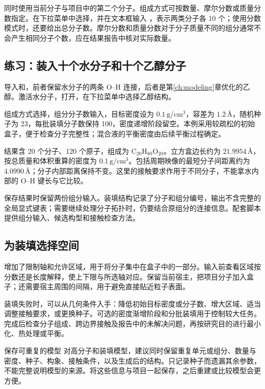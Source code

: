 同时使用当前分子与项目中的第二个分子。组成方式可按数量、摩尔分数或质量分数指定。在下拉菜单中选择，并在文本框输入 ，表示两类分子各 10 个；使用分数模式时，还要给出总分子数。摩尔分数和质量分数对于分子质量不同的组分通常不会产生相同分子个数，应在结果报告中核对实际数量。

\subsection{练习：装入十个水分子和十个乙醇分子}

导入和，前者保留水分子的两条 O--H 连接，后者是第\ref{ch:modeling}章优化的乙醇。激活水分子，打开，在下拉菜单中选择乙醇结构。

组成方式选择，组分分子数输入，目标密度设为 $0.1\,\mathrm{g/cm^3}$，容差为 $1.2\,\text{\AA}$，随机种子为 23，每批装填分子数保持 100，密度递增阶段留空。本例采用较疏松的初始盒子，便于检查分子完整性；混合液的平衡密度由后续平衡过程确定。

结果含 20 个分子、120 个原子，组成为 $\mathrm{C_{20}H_{80}O_{20}}$。立方盒边长约为 $21.9954\,\text{\AA}$，按总质量和体积重算的密度为 $0.1\,\mathrm{g/cm^3}$。包括周期映像的最短分子间距离约为 $4.0990\,\text{\AA}$；分子内部距离保持不变。这里的接触要求作用于不同分子，不能拿水内部的 O--H 键长与它比较。

保存结果时保留两份组分输入。装填结构记录了分子和组分编号，输出不含完整的全局显式键表；需要继续处理分子拓扑时，仍要结合原组分的连接信息。配套脚本提供组分输入、候选构型和接触检查方法。

\subsection{为装填选择空间}

增加了限制轴和允许区域，用于将分子集中在盒子中的一部分。输入前查看区域按分数还是长度解释，使上下限与所选轴对应。保留当前宿主，把项目分子加入盒子；还需要宿主周围的间隔，用于避免直接贴近粒子表面。

装填失败时，可以从几何条件入手：降低初始目标密度或分子数、增大区域、适当调整接触要求，或更换种子。可选的密度渐增阶段和分批装填用于控制较大任务。完成后检查分子组成、跨边界接触及报告中的未解决问题，再按研究目的进行最小化、热处理或平衡。

\begin{notebox}{保存可重复的模型}
对高分子和装填模型，建议同时保留重复单元或组分、数量与密度、种子、构象、接触条件，以及生成后的结构。只记录种子而遗漏其余参数，不能完整说明模型的来源。将这些信息与项目一起保存，之后重建或比较模型会更方便。
\end{notebox}
